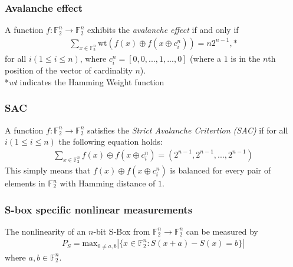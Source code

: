 \documentclass[handout]{beamer}
\newcommand{\field}[1]{\mathbb{#1}} %
\begin{document}
\begin{frame}
	\frametitle{Avalanche effect}
A function $f : \field{F}_2^n \to \field{F}_2^n$ exhibits the \emph{avalanche effect} if and only if 
	\begin{eqnarray*}
		\sum_{x \in \field{F}_2^n} \text{wt}(f(x) \oplus f(x \oplus c_{i}^{n})) = n2^{n-1},*
	\end{eqnarray*}
	for all $i (1 \leq i \leq n)$, where $c_{i}^{n} = [0, 0, ..., 1, ..., 0]$ (where a $1$ is in the $n$th position of the vector of cardinality $n$). \\
	\vspace{0.25cm}
	*\emph{wt} indicates the Hamming Weight function
\end{frame}

\begin{frame}
	\frametitle{SAC}
	A function $f : \field{F}_2^n \to \field{F}_2^n$ satisfies the \emph{Strict Avalanche Critertion (SAC)} if for all $i (1 \leq i \leq n)$ the following equation holds:
	\begin{eqnarray*}
		\sum_{x \in \field{F}_2^n} f(x) \oplus f(x \oplus c_i^n) = (2^{n-1}, 2^{n-1}, ..., 2^{n-1})
	\end{eqnarray*}
	This simply means that $f(x) \oplus f(x \oplus c_i^n)$ is balanced for every pair of elements in $\field{F}_2^n$ with Hamming distance of $1$. 
\end{frame}




\begin{frame}
	\frametitle{S-box specific nonlinear measurements}
	The nonlinearity of an $n$-bit S-Box from $\field{F}_2^n \to \field{F}_2^n$ can be measured by
	\begin{eqnarray*}
		P_S = \text{max}_{0 \not= a, b}|\{x \in \field{F}_2^n : S(x + a) - S(x) = b\}|
	\end{eqnarray*}
	where $a, b \in \field{F}_2^n$.
\end{frame}
\end{document}
